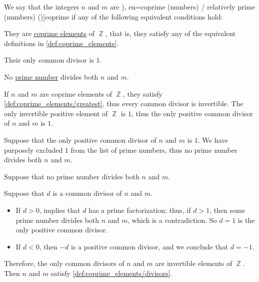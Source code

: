 \begin{definition}\label{def:coprime_numbers}
  We say that the integers \( n \) and \( m \) are \term[ru=взаимно простые (числа) (\cite[45]{Зорич2019АнализЧасть1}), en=coprime (numbers) / relatively prime (numbers) (\cite[107]{GowersEtAl2008PrincetonCompanion})]{coprime} if any of the following equivalent conditions hold:
  \begin{thmenum}
    \mimprovised They are \hyperref[def:coprime_elements]{coprime elements} of \( \BbbZ \), that is, they satisfy any of the equivalent definitions in \cref{def:coprime_elements}.

     Their only  common divisor is \( 1 \).

    \mimprovised No \hyperref[def:prime_number]{prime number} divides both \( n \) and \( m \).
  \end{thmenum}
\end{definition}
\begin{defproof}
   If \( n \) and \( m \) are coprime elements of \( \BbbZ \), they satisfy \cref{def:coprime_elements/greatest}, thus every common divisor is invertible. The only invertible positive element of \( \BbbZ \) is \( 1 \), thus the only positive common divisor of \( n \) and \( m \) is \( 1 \).

   Suppose that the only positive common divisor of \( n \) and \( m \) is \( 1 \). We have purposely excluded \( 1 \) from the list of prime numbers, thus no prime number divides both \( n \) and \( m \).

   Suppose that no prime number divides both \( n \) and \( m \).

  Suppose that \( d \) is a common divisor of \( n \) and \( m \).

  \begin{itemize}
    \item If \( d > 0 \),  implies that \( d \) has a prime factorization; thus, if \( d > 1 \), then some prime number divides both \( n \) and \( m \), which is a contradiction. So \( d = 1 \) is the only positive common divisor.

    \item If \( d < 0 \), then \( -d \) is a positive common divisor, and we conclude that \( d = -1 \).
  \end{itemize}

  Therefore, the only common divisors of \( n \) and \( m \) are invertible elements of \( \BbbZ \). Then \( n \) and \( m \) satisfy \cref{def:coprime_elements/divisors}.
\end{defproof}

